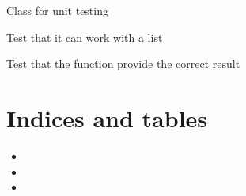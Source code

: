 \documentclass[letterpaper,10pt,english]{sphinxmanual}
\begin{document}
\begin{fulllineitems}
\label{\detokenize{index:test.test.TestFunction}}

Class for unit testing

\begin{fulllineitems}
\label{\detokenize{index:test.test.TestFunction.test_list}}
Test that it can work with a list

\end{fulllineitems}


\begin{fulllineitems}
\label{\detokenize{index:test.test.TestFunction.test_output}}
Test that the function provide the correct result

\end{fulllineitems}


\end{fulllineitems}



\chapter{Indices and tables}
\label{\detokenize{index:indices-and-tables}}\begin{itemize}
\item {} 

\item {} 

\item {} 

\end{itemize}
\end{document}

